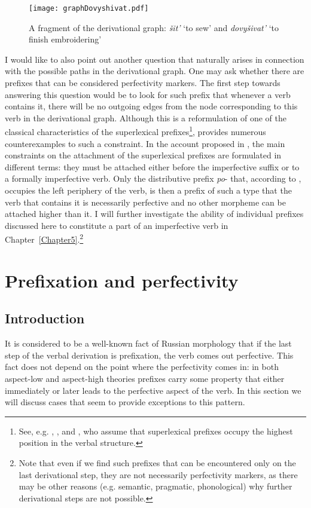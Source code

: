 \begin{figure}
\begin{center}
\texttt{[image: graphDovyshivat.pdf]}
\caption{A fragment of the derivational graph: \textit{\v{s}it'} `to sew' and \textit{dovy\v{s}ivat'} `to finish embroidering'\label{tree:dovyshivat}}
\end{center}
\end{figure}		

I would like to also point out another question that naturally arises in connection with the possible paths in the derivational graph. One may ask whether there are prefixes that can be considered perfectivity markers. The first step towards answering this question would be to look for such prefix that whenever a verb contains it, there will be no outgoing edges from the node corresponding to this verb in the derivational graph. Although this is a reformulation of one of the classical characteristics of the superlexical prefixes\footnote{See, e.g. \citet{Ramchand:04}, \citet{Svenonius:04a}, and \citet{Romanova:06}, who assume that superlexical prefixes occupy the highest position in the verbal structure.}, \citet{Tatevosov:07, Tatevosov:09} provides numerous counterexamples to such a constraint. In the account proposed in \citealt{Tatevosov:09}, the main constraints on the attachment of the superlexical prefixes are formulated in different terms: they must be attached either before the imperfective suffix or to a formally imperfective verb. Only the distributive prefix \textit{po}- that, according to \citet{Tatevosov:09}, occupies the left periphery of the verb, is then a prefix of such a type that the verb that contains it is necessarily perfective and no other morpheme can be attached higher than it. I will further investigate the ability of individual prefixes discussed here to constitute a part of an imperfective verb in Chapter~\ref{Chapter5}.\footnote{Note that even if we find such prefixes that can be encountered only on the last derivational step, they are not necessarily perfectivity markers, as there may be other reasons (e.g. semantic, pragmatic, phonological) why further derivational steps are not possible.}

\section{Prefixation and perfectivity}\label{section:new:perfectivity}

\subsection{Introduction}
It is considered to be a well-known fact of Russian morphology that if the last step of the verbal derivation is prefixation, the verb comes out perfective. This fact does not depend on the point where the perfectivity comes in: in both aspect-low \citep[][among others]{Verkuyl:95, Pinon:01, Ramchand:04} and aspect-high \citep{Paslawska:03, Gronn:10, Tatevosov:11} theories prefixes carry some property that either immediately or later leads to the perfective aspect of the verb. In this section we will discuss cases that seem to provide exceptions to this pattern.


